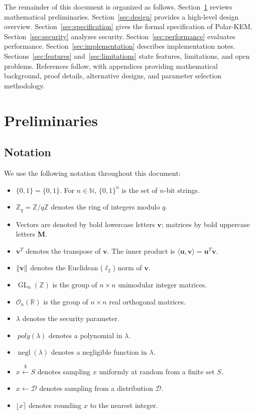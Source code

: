 \documentclass[11pt,a4paper]{article}
\newcommand{\polarKem}{\textsf{Polar-KEM}\xspace}
\newcommand{\bit}{\{0,1\}}
\newcommand{\Z}{\mathbb{Z}}
\newcommand{\R}{\mathbb{R}}
\DeclareMathOperator{\GL}{GL}
\DeclareMathOperator{\negl}{negl}
\newcommand{\sample}{\xleftarrow{\$}}
\DeclarePairedDelimiter{\norm}{\lVert}{\rVert}
\begin{document}
The remainder of this document is organized as follows. Section~\ref{sec:prelim} reviews mathematical preliminaries. Section~\ref{sec:design} provides a high-level design overview. Section~\ref{sec:specification} gives the formal specification of \polarKem. Section~\ref{sec:security} analyzes security. Section~\ref{sec:performance} evaluates performance. Section~\ref{sec:implementation} describes implementation notes. Sections~\ref{sec:features} and~\ref{sec:limitations} state features, limitations, and open problems. References follow, with appendices providing mathematical background, proof details, alternative designs, and parameter selection methodology.

\section{Preliminaries}\label{sec:prelim}

\subsection{Notation}\label{sec:notation}

We use the following notation throughout this document:

\begin{itemize}[leftmargin=2em]
\item $\bit = \{0, 1\}$. For $n \in \mathbb{N}$, $\bit^n$ is the set of $n$-bit strings.
\item $\Z_q = \Z / q\Z$ denotes the ring of integers modulo $q$.
\item Vectors are denoted by bold lowercase letters $\mathbf{v}$; matrices by bold uppercase letters $\mathbf{M}$.
\item $\mathbf{v}^T$ denotes the transpose of $\mathbf{v}$. The inner product is $\langle \mathbf{u}, \mathbf{v} \rangle = \mathbf{u}^T \mathbf{v}$.
\item $\norm{\mathbf{v}}$ denotes the Euclidean ($\ell_2$) norm of $\mathbf{v}$.
\item $\GL_n(\Z)$ is the group of $n \times n$ unimodular integer matrices.
\item $\mathcal{O}_n(\R)$ is the group of $n \times n$ real orthogonal matrices.
\item $\lambda$ denotes the security parameter.
\item $\ poly(\lambda)$ denotes a polynomial in $\lambda$.
\item $\negl(\lambda)$ denotes a negligible function in $\lambda$.
\item $x \sample S$ denotes sampling $x$ uniformly at random from a finite set $S$.
\item $x \gets \mathcal{D}$ denotes sampling from a distribution $\mathcal{D}$.
\item $\lfloor x \rceil$ denotes rounding $x$ to the nearest integer.
\end{itemize}
\end{document}
